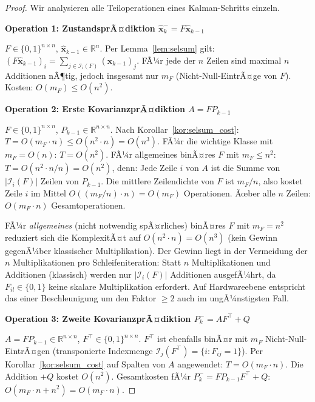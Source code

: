 ﻿\documentclass[a4paper,12pt]{article}
\theoremstyle{definition}
\begin{document}
\begin{proof}
Wir analysieren alle Teiloperationen eines Kalman-Schritts einzeln.

\medskip
\textbf{Operation 1: ZustandsprÃ¤diktion $\hat{\mathbf{x}}_k^- = F\hat{\mathbf{x}}_{k-1}$}

$F \in \{0,1\}^{n\times n}$, $\hat{\mathbf{x}}_{k-1} \in \mathbb{R}^n$.
Per Lemma~\ref{lem:selsum} gilt:
$(F\hat{\mathbf{x}}_{k-1})_i = \sum_{j \in \mathcal{I}_i(F)} (\hat{\mathbf{x}}_{k-1})_j$.
FÃ¼r jede der $n$ Zeilen sind maximal $n$ Additionen nÃ¶tig, jedoch insgesamt nur $m_F$
(Nicht-Null-EintrÃ¤ge von $F$). Kosten: $O(m_F) \leq O(n^2)$.

\medskip
\textbf{Operation 2: Erste KovarianzprÃ¤diktion $A = F P_{k-1}$}

$F \in \{0,1\}^{n\times n}$, $P_{k-1} \in \mathbb{R}^{n \times n}$.
Nach Korollar~\ref{kor:selsum_cost}: $T = O(m_F \cdot n) \leq O(n^2 \cdot n) = O(n^3)$.
FÃ¼r die wichtige Klasse mit $m_F = O(n)$: $T = O(n^2)$.
FÃ¼r allgemeines binÃ¤res $F$ mit $m_F \leq n^2$: $T = O(n^2 \cdot n / n) = O(n^2)$,
denn: Jede Zeile $i$ von $A$ ist die Summe von $|\mathcal{I}_i(F)|$ Zeilen von
$P_{k-1}$. Die mittlere Zeilendichte von $F$ ist $m_F/n$, also kostet Zeile $i$
im Mittel $O((m_F/n) \cdot n) = O(m_F)$ Operationen. Ãœber alle $n$ Zeilen:
$O(m_F \cdot n)$ Gesamtoperationen.

FÃ¼r \emph{allgemeines} (nicht notwendig spÃ¤rliches) binÃ¤res $F$ mit $m_F = n^2$
reduziert sich die KomplexitÃ¤t auf $O(n^2 \cdot n) = O(n^3)$ (kein Gewinn gegenÃ¼ber
klassischer Multiplikation). Der Gewinn liegt in der Vermeidung der $n$ Multiplikationen
pro Schleifeniteration: Statt $n$ Multiplikationen und Additionen (klassisch)
werden nur $|\mathcal{I}_i(F)|$ Additionen ausgefÃ¼hrt, da $F_{il} \in \{0,1\}$
keine skalare Multiplikation erfordert. Auf Hardwareebene entspricht das einer
Beschleunigung um den Faktor $\geq 2$ auch im ungÃ¼nstigsten Fall.

\medskip
\textbf{Operation 3: Zweite KovarianzprÃ¤diktion $P_k^- = A F^\top + Q$}

$A = F P_{k-1} \in \mathbb{R}^{n\times n}$, $F^\top \in \{0,1\}^{n\times n}$.
$F^\top$ ist ebenfalls binÃ¤r mit $m_F$ Nicht-Null-EintrÃ¤gen (transponierte Indexmenge
$\mathcal{I}_j(F^\top) = \{i : F_{ij}=1\}$). Per Korollar~\ref{kor:selsum_cost}
auf Spalten von $A$ angewendet: $T = O(m_F \cdot n)$.
Die Addition $+Q$ kostet $O(n^2)$.
Gesamtkosten fÃ¼r $P_k^- = FP_{k-1}F^\top + Q$: $O(m_F \cdot n + n^2) = O(m_F \cdot n)$.


\end{proof}
\end{document}
